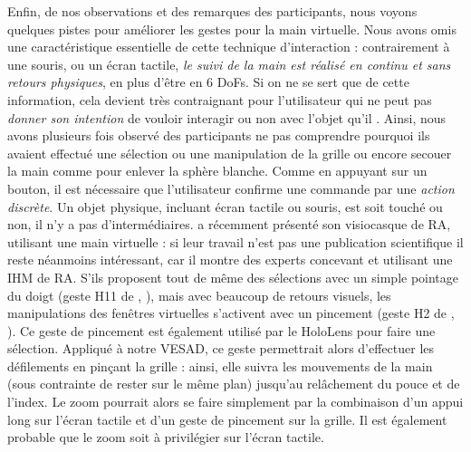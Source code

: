 Enfin, de nos observations et des remarques des participants, nous voyons quelques pistes pour améliorer les gestes pour la main virtuelle. Nous avons omis une caractéristique essentielle de cette technique d'interaction : contrairement à une souris, ou un écran tactile, \emph{le suivi de la main est réalisé en continu et sans retours physiques}, en plus d'être en 6 DoFs. Si on ne se sert que de cette information, cela devient très contraignant pour l'utilisateur qui ne peut pas \emph{donner son intention} de vouloir interagir ou non avec l'objet qu'il . Ainsi, nous avons plusieurs fois observé des participants ne pas comprendre pourquoi ils avaient effectué une sélection ou une manipulation de la grille ou encore secouer la main comme pour enlever la sphère blanche. Comme en appuyant sur un bouton, il est nécessaire que l'utilisateur confirme une commande par une \emph{action discrète}. Un objet physique, incluant écran tactile ou souris, est soit touché ou non, il n'y a pas d'intermédiaires. \cite{LeapMotion2018} a récemment présenté son visiocasque de RA, utilisant une main virtuelle : si leur travail n'est pas une publication scientifique il reste néanmoins intéressant, car il montre des experts concevant et utilisant une IHM de RA. S'ils proposent tout de même des sélections avec un simple pointage du doigt (geste H11 de \cite{Piumsomboon2013}, ), mais avec beaucoup de retours visuels, les manipulations des fenêtres virtuelles s'activent avec un pincement (geste H2 de \cite{Piumsomboon2013}, ). Ce geste de pincement est également utilisé par le HoloLens pour faire une sélection. Appliqué à notre VESAD, ce geste permettrait alors d'effectuer les défilements en pinçant la grille : ainsi, elle suivra les mouvements de la main (sous contrainte de rester sur le même plan) jusqu'au relâchement du pouce et de l'index. Le zoom pourrait alors se faire simplement par la combinaison d'un appui long sur l'écran tactile et d'un geste de pincement sur la grille. Il est également probable que le zoom soit à privilégier sur l'écran tactile.

